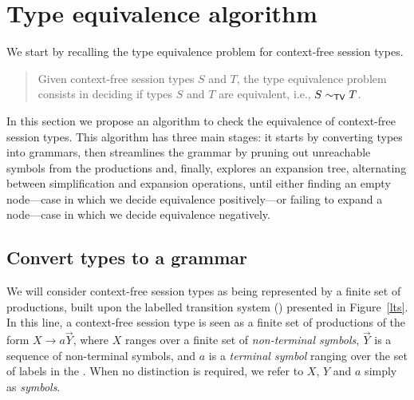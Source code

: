 \section{Type equivalence algorithm}
\label{sec:algorithm}

We start by recalling the type equivalence problem for context-free 
session types.

\begin{quote}
  Given context-free session types $S$ and $T$, the type equivalence
  problem consists in deciding if types $S$ and $T$ are equivalent,
  i.e., $S \sim_{\mathsf{TV}} T$.
\end{quote}

In this section we propose an algorithm to check the equivalence of 
context-free session types. This algorithm has three main stages: 
it starts by converting types into grammars, then streamlines the grammar
by pruning out unreachable symbols from the productions and, finally, 
explores an expansion tree, alternating 
between simplification and expansion operations, until either finding 
an empty node---case in which we decide equivalence positively---or 
failing to expand a node---case in which we decide equivalence negatively.

\subsection{Convert types to a grammar}
\label{subsec:typeToGrammar}

We will consider context-free session types as being represented by a 
finite set of productions, built upon the labelled transition system (\LTS)
presented in Figure~\ref{lts}. In this line, a context-free session type 
is seen as a finite set of productions of the form $X\rightarrow a \vec Y$, 
where $X$ ranges over a finite set of \emph{non-terminal symbols}, $\vec Y$ 
is a sequence of non-terminal symbols, and $a$ is a \emph{terminal symbol}
ranging over the set of labels in the \LTS. When no distinction is required, 
we refer to $X$, $Y$ and $a$ simply as \emph{symbols}.

